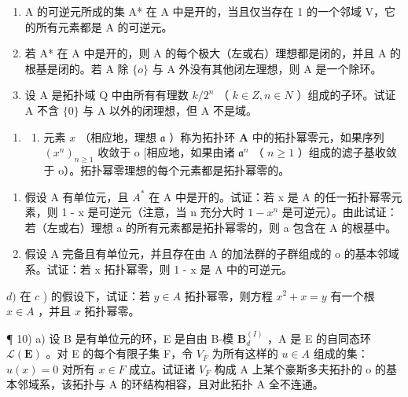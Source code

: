 \begin{enumerate}
\def\labelenumi{\alph{enumi})}
\item
  A 的可逆元所成的集 A* 在 A 中是开的，当且仅当存在 1 的一个邻域 V，它的所有元素都是 A 的可逆元。
\item
  若 A* 在 A 中是开的，则 A 的每个极大（左或右）理想都是闭的，并且 A 的根基是闭的。若 A 除 \(\{o\}\) 与 A 外没有其他闭左理想，则 A 是一个除环。
\item
  设 A 是拓扑域 Q 中由所有有理数 \(k/2^{n}\) （ \(k \in Z, n \in N\) ）组成的子环。试证 A 不含 \(\{0\}\) 与 A 以外的闭理想，但 A 不是域。
\end{enumerate}

\begin{enumerate}
\def\labelenumi{\arabic{enumi})}
\setcounter{enumi}{8}
\tightlist
\item
  \begin{enumerate}
  \def\labelenumii{\alph{enumii})}
  \tightlist
  \item
    元素 \(x\) （相应地，理想 \(\mathfrak{a}\) ）称为拓扑环 \(\mathbf{A}\) 中的拓扑幂零元，如果序列 \((x^n)_{n\geqslant 1}\) 收敛于 o {[}相应地，如果由诸 \(\mathfrak{a}^n\) （ \(n\geqslant 1\) ）组成的滤子基收敛于 o）。拓扑幂零理想的每个元素都是拓扑幂零的。
  \end{enumerate}
\end{enumerate}

\begin{enumerate}
\def\labelenumi{\alph{enumi})}
\setcounter{enumi}{1}
\item
  假设 A 有单位元，且 \(A^{*}\) 在 A 中是开的。试证：若 x 是 A 的任一拓扑幂零元素，则 1 - x 是可逆元（注意，当 n 充分大时 \(1 - x^{n}\) 是可逆元）。由此试证：若（左或右）理想 a 的所有元素都是拓扑幂零的，则 a 包含在 A 的根基中。
\item
  假设 A 完备且有单位元，并且存在由 A 的加法群的子群组成的 o 的基本邻域系。试证：若 x 拓扑幂零，则 1 - x 是 A 中的可逆元。
\end{enumerate}

\(d)\) 在 \(c\) ) 的假设下，试证：若 \(y \in A\) 拓扑幂零，则方程 \(x^{2} + x = y\) 有一个根 \(x \in A\) ，并且 \(x\) 拓扑幂零。

¶ 10) a) 设 B 是有单位元的环，E 是自由 B-模 \(\mathbf{B}_{d}^{(I)}\) ，A 是 E 的自同态环 \(\mathcal{L}(\mathbf{E})\) 。对 E 的每个有限子集 F，令 \(V_{F}\) 为所有这样的 \(u \in A\) 组成的集：\(u(x) = 0\) 对所有 \(x \in F\) 成立。试证诸 \(V_{F}\) 构成 A 上某个豪斯多夫拓扑的 o 的基本邻域系，该拓扑与 A 的环结构相容，且对此拓扑 A 全不连通。

